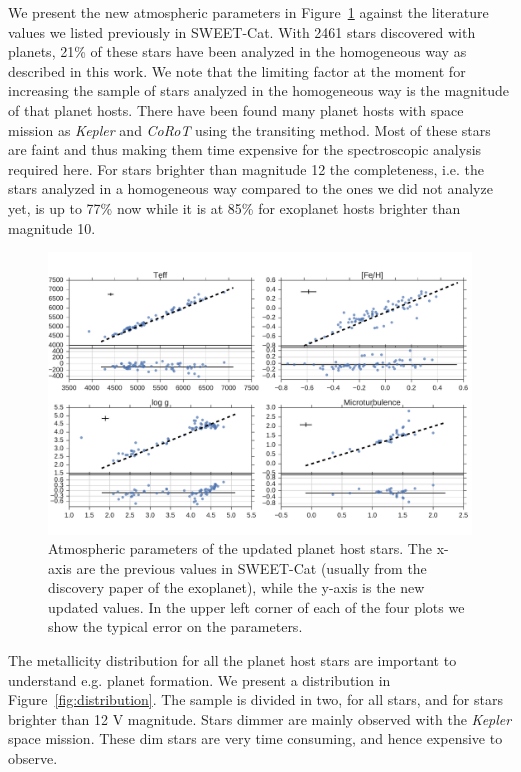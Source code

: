 \documentclass{aa}
\begin{document}
We present the new atmospheric parameters in Figure~\ref{fig:update} against the
literature values we listed previously in SWEET-Cat. With 2461 stars discovered
with planets, 21\% of these stars have been analyzed in the homogeneous way as
described in this work. We note that the limiting factor at the moment for
increasing the sample of stars analyzed in the homogeneous way is the magnitude
of that planet hosts. There have been found many planet hosts with space mission
as \emph{Kepler} and \emph{CoRoT} using the transiting method. Most of these
stars are faint and thus making them time expensive for the spectroscopic
analysis required here. For stars brighter than magnitude 12 the completeness,
i.e. the stars analyzed in a homogeneous way compared to the ones we did not
analyze yet, is up to 77\% now while it is at 85\% for exoplanet hosts brighter
than magnitude 10.

\begin{figure}[tpb]
    \centering
    \includegraphics[width=1.0\linewidth,natwidth=870,natheight=580]{figures/update.pdf}
    \caption{Atmospheric parameters of the updated planet host stars. The x-axis
    are the previous values in SWEET-Cat (usually from the discovery paper of
    the exoplanet), while the y-axis is the new updated values. In the upper
    left corner of each of the four plots we show the typical error on the
    parameters.}
    \label{fig:update}
\end{figure}

The metallicity distribution for all the planet host stars are important to
understand e.g. planet formation. We present a distribution in
Figure~\ref{fig:distribution}. The sample is divided in two, for all stars, and
for stars brighter than 12 V magnitude. Stars dimmer are mainly observed with
the \emph{Kepler} space mission. These dim stars are very time consuming, and
hence expensive to observe.
\end{document}
